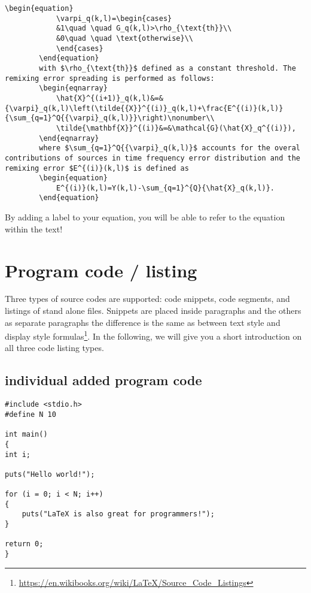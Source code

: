 	\begin{mdframed}
		\begin{lstlisting}[caption={A new math example}]
		\begin{equation}
			\varpi_q(k,l)=\begin{cases}
			&1\quad \quad G_q(k,l)>\rho_{\text{th}}\\
			&0\quad \quad \text{otherwise}\\
			\end{cases}
		\end{equation}
		with $\rho_{\text{th}}$ defined as a constant threshold. The remixing error spreading is performed as follows:
		\begin{eqnarray}
			\hat{X}^{(i+1)}_q(k,l)&=&{\varpi}_q(k,l)\left(\tilde{{X}}^{(i)}_q(k,l)+\frac{E^{(i)}(k,l)}{\sum_{q=1}^Q{{\varpi}_q(k,l)}}\right)\nonumber\\
			\tilde{\mathbf{X}}^{(i)}&=&\mathcal{G}(\hat{X}_q^{(i)}),
		\end{eqnarray}
		where $\sum_{q=1}^Q{{\varpi}_q(k,l)}$ accounts for the overal contributions of sources in time frequency error distribution and the remixing error $E^{(i)}(k,l)$ is defined as 
		\begin{equation}
			E^{(i)}(k,l)=Y(k,l)-\sum_{q=1}^{Q}{\hat{X}_q(k,l)}.
		\end{equation}
		\end{lstlisting}
		By adding a label to your equation, you will be able to refer to the equation within the text!
	\end{mdframed}

\section{Program code / listing}
Three types of source codes are supported: code snippets, code segments, and
listings of stand alone files. Snippets are placed inside paragraphs and the others as
separate paragraphs the difference is the same as between text style and display
style formulas\footnote{\url{https://en.wikibooks.org/wiki/LaTeX/Source_Code_Listings}}. In the following, we will give you a short introduction on all three code listing types.

\subsection{individual added program code}
\begin{lstlisting}[caption = {Single code}]
#include <stdio.h>
#define N 10

int main()
{
int i;

puts("Hello world!");

for (i = 0; i < N; i++)
{
	puts("LaTeX is also great for programmers!");
}

return 0;
}
\end{lstlisting}

